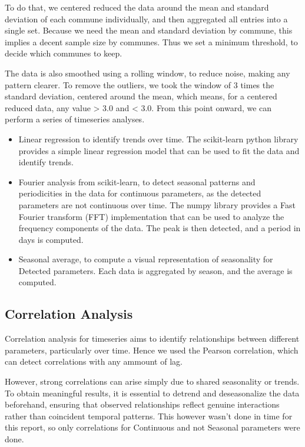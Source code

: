 \documentclass{article}
\begin{document}
To do that, we centered reduced the data around the mean and standard deviation of each commune individually, and then aggregated all entries into a single set.
Because we need the mean and standard deviation by commune, this implies a decent sample size by communes.
Thus we set a minimum threshold, to decide which communes to keep.

The data is also smoothed using a rolling window, to reduce noise, making any pattern clearer. To remove the outliers, we took the window of 3 times the standard deviation, centered around the mean, which means, for a centered reduced data, any value > 3.0 and < 3.0.
From this point onward, we can perform a series of timeseries analyses.

\newpage

\begin{itemize}
    \item Linear regression to identify trends over time. The scikit-learn python library provides a simple linear regression model that can be used to fit the data and identify trends.
    \item Fourier analysis from scikit-learn, to detect seasonal patterns and periodicities in the data for continuous parameters, as the detected parameters are not continuous over time. The numpy library provides a Fast Fourier transform (FFT) implementation that can be used to analyze the frequency components of the data. The peak is then detected, and a period in days is computed.
    \item Seasonal average, to compute a visual representation of seasonality for Detected parameters. Each data is aggregated by season, and the average is computed.
\end{itemize}



\subsection{Correlation Analysis}
Correlation analysis for timeseries aims to identify relationships between different parameters, 
particularly over time. Hence we used the Pearson correlation, which can detect correlations with any ammount of lag.

However, strong correlations can arise simply due to shared seasonality or trends. 
To obtain meaningful results, it is essential to detrend and deseasonalize 
the data beforehand, ensuring that observed relationships 
reflect genuine interactions rather than coincident temporal patterns.
This however wasn't done in time for this report, so only correlations for Continuous and not Seasonal parameters were done.
\end{document}
